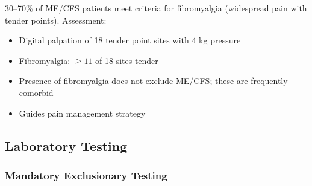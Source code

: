 \begin{observation}
\label{obs:fibromyalgia-overlap}
30--70\% of ME/CFS patients meet criteria for fibromyalgia (widespread pain with tender points). Assessment:
\begin{itemize}
    \item Digital palpation of 18 tender point sites with 4 kg pressure
    \item Fibromyalgia: $\geq 11$ of 18 sites tender
    \item Presence of fibromyalgia does not exclude ME/CFS; these are frequently comorbid
    \item Guides pain management strategy
\end{itemize}
\end{observation}

\subsection{Laboratory Testing}

\subsubsection{Mandatory Exclusionary Testing}

